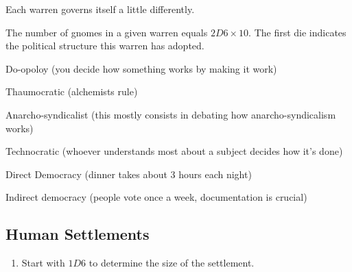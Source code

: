 \begin{multicols}{2}
Each warren governs itself a little differently.

The number of gnomes in a given warren equals $2D6\times 10$.
The first die indicates the political structure this warren has adopted.

\begin{dlist}
  \item
  Do-opoloy (you decide how something works by making it work)
  \item
  Thaumocratic (alchemists rule)
  \item
  Anarcho-syndicalist (this mostly consists in debating how anarcho-syndicalism works)
  \item
  Technocratic (whoever understands most about a subject decides how it's done)
  \item
  Direct Democracy (dinner takes about 3 hours each night)
  \item
  Indirect democracy (people vote once a week, documentation is crucial)
\end{dlist}


\subsection{Human Settlements}

\begin{enumerate}
  \item
  Start with $1D6$ to determine the size of the settlement.
\end{enumerate}
\end{multicols}
